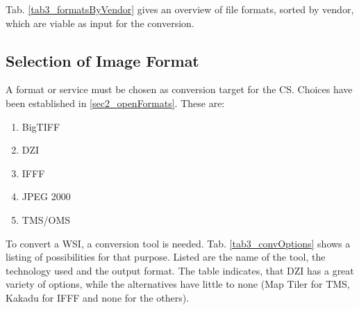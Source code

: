 Tab. \ref{tab3_formatsByVendor} gives an overview of file formats, sorted by vendor, which are viable as input for the conversion.


\subsection{Selection of Image Format}
A format or service must be chosen as conversion target for the CS. Choices have been established in \ref{sec2_openFormats}. These are:
\begin{enumerate}[(1)]
	\item BigTIFF
	\item DZI
	\item IFFF
	\item JPEG 2000
	\item TMS/OMS
\end{enumerate}

To convert a WSI, a conversion tool is needed. Tab. \ref{tab3_convOptions} shows a listing of possibilities for that purpose. Listed are the name of the tool, the technology used and the output format. The table indicates, that DZI has a great variety of options, while the alternatives have little to none (Map Tiler for TMS, Kakadu for IFFF and none for the others).

